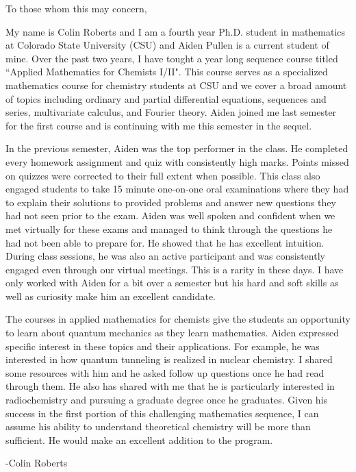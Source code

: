 \documentclass{article}
\begin{document}
\noindent To those whom this may concern,

My name is Colin Roberts and I am a fourth year Ph.D. student in mathematics at Colorado State University (CSU) and Aiden Pullen is a current student of mine. Over the past two years, I have tought a year long sequence course titled ``Applied Mathematics for Chemists I/II". This course serves as a specialized mathematics course for chemistry students at CSU and we cover a broad amount of topics including ordinary and partial differential equations, sequences and series, multivariate calculus, and Fourier theory. Aiden joined me last semester for the first course and is continuing with me this semester in the sequel.

In the previous semester, Aiden was the top performer in the class. He completed every homework assignment and quiz with consistently high marks. Points missed on quizzes were corrected to their full extent when possible. This class also engaged students to take 15 minute one-on-one oral examinations where they had to explain their solutions to provided problems and answer new questions they had not seen prior to the exam. Aiden was well spoken and confident when we met virtually for these exams and managed to think through the questions he had not been able to prepare for. He showed that he has excellent intuition. During class sessions, he was also an active participant and was consistently engaged even through our virtual meetings.  This is a rarity in these days. I have only worked with Aiden for a bit over a semester but his hard and soft skills as well as curiosity make him an excellent candidate.

The courses in applied mathematics for chemists give the students an opportunity to learn about quantum mechanics as they learn mathematics. Aiden expressed specific interest in these topics and their applications. For example, he was interested in how quantum tunneling is realized in nuclear chemistry. I shared some resources with him and he asked follow up questions once he had read through them. He also has shared with me that he is particularly interested in radiochemistry and pursuing a graduate degree once he graduates. Given his success in the first portion of this challenging mathematics sequence, I can assume his ability to understand theoretical chemistry will be more than sufficient. He would make an excellent addition to the program.


\noindent -Colin Roberts
\end{document}
